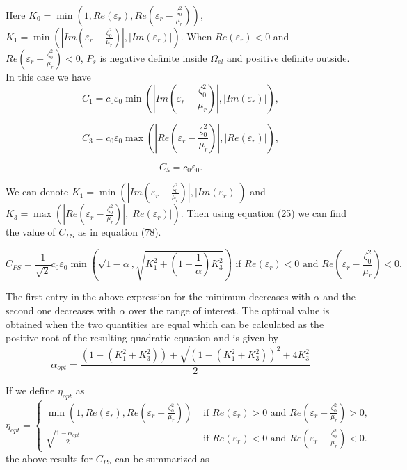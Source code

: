 Here $K_0 = \min(1,Re(\varepsilon_r), Re(\varepsilon_r -\frac{\zeta_0^2}{\mu_r}))$,  $K_1 = \min(|Im(\varepsilon_r-\frac{\zeta_0^2}{\mu_r})|, |Im(\varepsilon_r)|)$.
When $Re(\varepsilon_r) <0$ and $Re(\varepsilon_r -\frac{\zeta_0^2}{\mu_r})  < 0$,  $P_s$ is negative definite inside $\Omega_{el}$ and  
positive definite  outside.
In this case we have
\begin{equation}
\tag{76}
C_1 =  c_0\varepsilon_0 \min(|Im(\varepsilon_r-\frac{\zeta_0^2}{\mu_r})|, |Im(\varepsilon_r)|), 
\end{equation}

\begin{equation}
\tag{77}
C_3 = c_0\varepsilon_0\max(|Re(\varepsilon_r-\frac{\zeta_0^2}{\mu_r})|, |Re(\varepsilon_r)|), 
\end{equation}

\begin{equation}
\tag{78}
C_5 = c_0\varepsilon_0.
\end{equation}

We can denote $K_1 = \min(|Im(\varepsilon_r-\frac{\zeta_0^2}{\mu_r})|, |Im(\varepsilon_r)|)$ and 
$K_3 = \max(|Re(\varepsilon_r-\frac{\zeta_0^2}{\mu_r})|, |Re(\varepsilon_r)|)$.
Then using equation (25) we can find the value of $C_{PS}$ as in equation (78).


\begin{equation}
\tag{79}
C_{PS} = \frac{1}{\sqrt{2}}c_0\varepsilon_0\min\left(\sqrt{1-\alpha}, \sqrt{K_1^2 + (1-\frac{1}{\alpha})K_3^2}\right)  
\text{ if } Re(\varepsilon_r) < 0 \text{ and } Re(\varepsilon_r -\frac{\zeta_0^2}{\mu_r})  < 0.
\end{equation}

The first entry in the above expression for the minimum decreases with $\alpha$ and the second one decreases with $\alpha$ over the range of interest.
The optimal value is obtained when the two quantities are equal which can be calculated as the positive root of the resulting quadratic equation and is given by
\begin{equation}
\tag{80}
\alpha_{opt} = \frac{(1-(K_1^2+K_3^2)) + \sqrt{(1-(K_1^2+K_3^2))^2 + 4K_3^2}}{2}
\end{equation}

If we define $\eta_{opt}$ as 
\begin{equation}
\tag{81}
\eta_{opt} = 
\begin{cases}
\min(1,Re(\varepsilon_r), Re(\varepsilon_r -\frac{\zeta_0^2}{\mu_r})) & \text{ if } Re(\varepsilon_r) >0 \text{ and } Re(\varepsilon_r -\frac{\zeta_0^2}{\mu_r})  > 0,  \\ 
\sqrt{\frac{1-\alpha_{opt}}{2}}  & \text{ if } Re(\varepsilon_r) < 0  \text{ and } Re(\varepsilon_r -\frac{\zeta_0^2}{\mu_r})  < 0. 
\end{cases}
\end{equation}
the above results for $C_{PS}$ can be summarized as 

